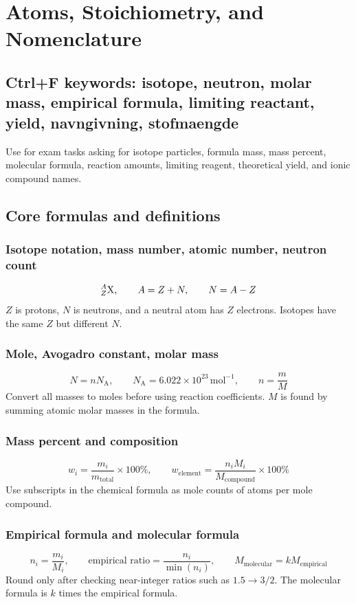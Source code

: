 \section{Atoms, Stoichiometry, and Nomenclature}

\subsection{Ctrl+F keywords: isotope, neutron, molar mass, empirical formula, limiting reactant, yield, navngivning, stofmaengde}
Use for exam tasks asking for isotope particles, formula mass, mass percent, molecular formula, reaction amounts, limiting reagent, theoretical yield, and ionic compound names.

\subsection{Core formulas and definitions}

\subsubsection{Isotope notation, mass number, atomic number, neutron count}
\[
{}^{A}_{Z}\ce{X}, \qquad A=Z+N, \qquad N=A-Z
\]
\(Z\) is protons, \(N\) is neutrons, and a neutral atom has \(Z\) electrons. Isotopes have the same \(Z\) but different \(N\).

\subsubsection{Mole, Avogadro constant, molar mass}
\[
N=nN_{\mathrm A}, \qquad N_{\mathrm A}=6.022\times10^{23}\,\mathrm{mol^{-1}}, \qquad n=\frac{m}{M}
\]
Convert all masses to moles before using reaction coefficients. \(M\) is found by summing atomic molar masses in the formula.

\subsubsection{Mass percent and composition}
\[
w_i=\frac{m_i}{m_{\mathrm{total}}}\times100\%, \qquad
w_{\mathrm{element}}=\frac{n_iM_i}{M_{\mathrm{compound}}}\times100\%
\]
Use subscripts in the chemical formula as mole counts of atoms per mole compound.

\subsubsection{Empirical formula and molecular formula}
\[
n_i=\frac{m_i}{M_i}, \qquad
\text{empirical ratio}=\frac{n_i}{\min(n_i)}, \qquad
M_{\mathrm{molecular}}=kM_{\mathrm{empirical}}
\]
Round only after checking near-integer ratios such as \(1.5\to3/2\). The molecular formula is \(k\) times the empirical formula.

